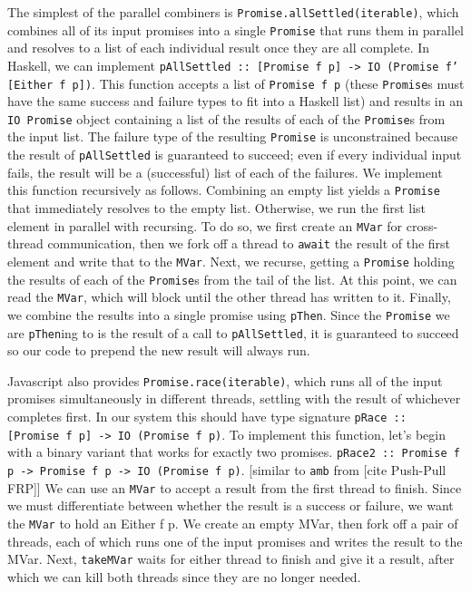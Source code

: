 \documentclass[12pt, english, letterpaper]{kuthesis}
\newcommand{\lit}[1]{\texttt{#1}}
\begin{document}
The simplest of the parallel combiners is \lit{Promise.allSettled(iterable)}, which combines all of its input promises into a single \lit{Promise} that runs them in parallel and resolves to a list of each individual result once they are all complete.  In Haskell, we can implement \lit{pAllSettled :: [Promise f p] -> IO (Promise f' [Either f p])}.  This function accepts a list of \lit{Promise f p} (these \lit{Promise}s must have the same success and failure types to fit into a Haskell list) and results in an \lit{IO Promise} object containing a list of the results of each of the \lit{Promise}s from the input list.  The failure type of the resulting \lit{Promise} is unconstrained because the result of \lit{pAllSettled} is guaranteed to succeed; even if every individual input fails, the result will be a (successful) list of each of the failures.  We implement this function recursively as follows.  Combining an empty list yields a \lit{Promise} that immediately resolves to the empty list.  Otherwise, we run the first list element in parallel with recursing.  To do so, we first create an \lit{MVar} for cross-thread communication, then we fork off a thread to \lit{await} the result of the first element and write that to the \lit{MVar}.  Next, we recurse, getting a \lit{Promise} holding the results of each of the \lit{Promise}s from the tail of the list.  At this point, we can read the \lit{MVar}, which will block until the other thread has written to it.  Finally, we combine the results into a single promise using \lit{pThen}.  Since the \lit{Promise} we are \lit{pThen}ing to is the result of a call to \lit{pAllSettled}, it is guaranteed to succeed so our code to prepend the new result will always run.


Javascript also provides \lit{Promise.race(iterable)}, which runs all of the input promises simultaneously in different threads, settling with the result of whichever completes first.  In our system this should have type signature \lit{pRace :: [Promise f p] -> IO (Promise f p)}.  To implement this function, let's begin with a binary variant that works for exactly two promises.  \lit{pRace2 :: Promise f p -> Promise f p -> IO (Promise f p)}.  [similar to \lit {amb} from [cite Push-Pull FRP]]  We can use an \lit{MVar} to accept a result from the first thread to finish.  Since we must differentiate between whether the result is a success or failure, we want the \lit{MVar} to hold an {Either f p}.  We create an empty MVar, then fork off a pair of threads, each of which runs one of the input promises and writes the result to the MVar.  Next, \lit{takeMVar} waits for either thread to finish and give it a result, after which we can kill both threads since they are no longer needed.
\end{document}
